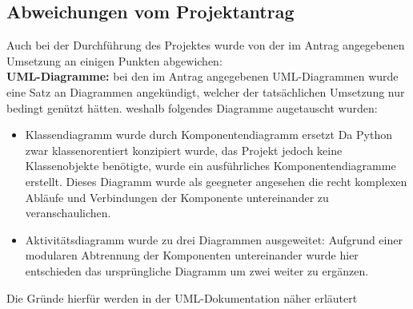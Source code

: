 \subsection{Abweichungen vom Projektantrag}\label{sec:AbweichungenProjektantrag}
Auch bei der Durchführung des Projektes wurde von der im Antrag angegebenen Umsetzung an einigen Punkten abgewichen:\\
	\textbf{UML-Diagramme:} 
	bei den im Antrag angegebenen UML-Diagrammen wurde eine Satz an Diagrammen angekündigt, welcher der tatsächlichen Umsetzung nur bedingt genützt hätten. 
	weshalb folgendes Diagramme augetauscht wurden: 
	\begin{itemize}
		\item Klassendiagramm wurde durch Komponentendiagramm ersetzt
	Da Python zwar klassenorentiert konzipiert wurde, das Projekt jedoch keine Klassenobjekte benötigte, wurde ein ausführliches Komponentendiagramme erstellt.
		Dieses Diagramm wurde als geegneter angesehen die recht komplexen Abläufe und Verbindungen der Komponente untereinander zu veranschaulichen.  
		\item Aktivitätsdiagramm wurde zu drei Diagrammen ausgeweitet: 
		Aufgrund einer modularen Abtrennung der Komponenten untereinander wurde hier entschieden das ursprüngliche Diagramm um zwei weiter zu ergänzen. 
	\end{itemize}
	Die Gründe hierfür werden in der UML-Dokumentation näher erläutert\\

